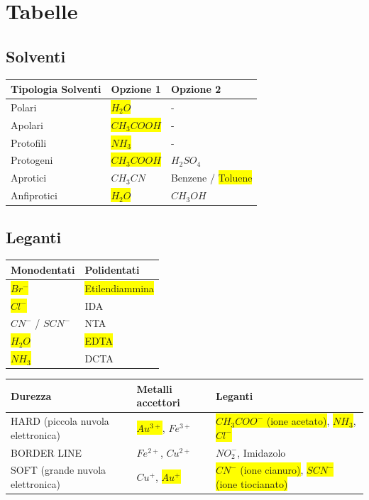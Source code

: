 \documentclass{article}
\begin{document}
\hrulefill

\newpage

\section{Tabelle}

\subsection{Solventi}
\begin{center}
\begin{tabular}{l|l|l}
	\toprule
	Tipologia Solventi & Opzione 1 & Opzione 2 \\
	\midrule
	Polari & \colorbox{yellow}{$H_2O$} & - \\
	Apolari & \colorbox{yellow}{$CH_3COOH$} & - \\
	Protofili & \colorbox{yellow}{$NH_3$} & - \\
	Protogeni & \colorbox{yellow}{$CH_3COOH$} & $H_2SO_4$ \\
	Aprotici & $CH_3CN$ & Benzene / \colorbox{yellow}{Toluene} \\
	Anfiprotici & \colorbox{yellow}{$H_2O$} & $CH_3OH$ \\
	\bottomrule
\end{tabular}
\end{center}

\subsection{Leganti}
\begin{center}
\begin{tabular}{l|l}
	\toprule
	Monodentati & Polidentati \\
	\midrule
	\colorbox{yellow}{$Br^-$} & \colorbox{yellow}{Etilendiammina} \\
	\colorbox{yellow}{$Cl^-$} & IDA \\
	$CN^-$ / $SCN^-$ & NTA \\
	\colorbox{yellow}{$H_2O$} & \colorbox{yellow}{EDTA} \\
	\colorbox{yellow}{$NH_3$} & DCTA \\
	\bottomrule
\end{tabular}
\end{center}

\begin{center}
\begin{tabular}{l|l|l}
	\toprule
	Durezza & Metalli accettori & Leganti \\
	\midrule
	HARD (piccola nuvola elettronica) & \colorbox{yellow}{$Au^{3+}$}, $Fe^{3+}$ & \colorbox{yellow}{$CH_3COO^-$ (ione acetato)}, \colorbox{yellow}{$NH_3$}, \colorbox{yellow}{$Cl^-$} \\
	BORDER LINE & $Fe^{2+}$, $Cu^{2+}$ & $NO_2^-$, Imidazolo \\
	SOFT (grande nuvola elettronica)& $Cu^+$, \colorbox{yellow}{$Au^+$} & \colorbox{yellow}{$CN^-$ (ione cianuro)}, \colorbox{yellow}{$SCN^-$ (ione tiocianato)}\\
	\bottomrule
\end{tabular}
\end{center}
\end{document}
